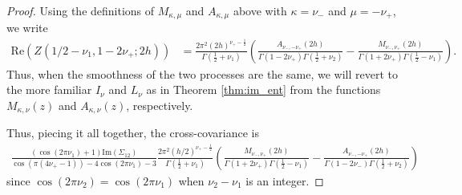 \documentclass[11pt]{article}
\begin{document}
\begin{proof}
Using the definitions of $M_{\kappa, \mu}$ and $A_{\kappa, \mu}$ above with $\kappa = \nu_-$ and $\mu = -\nu_+$, we write\begin{align*}
\textrm{Re}(Z(1/2 - \nu_{1},1 - 2\nu_+;2h)) &= \frac{2\pi^2(2h)^{\nu_+-\frac12}}{\Gamma(\frac12 + \nu_{1})}\left(\frac{ A_{\nu_-,-\nu_+}(2h)}{\Gamma(1 - 2\nu_+)\Gamma(\frac12 + \nu_{2})} - \frac{M_{\nu_-,\nu_+}(2h)}{\Gamma(1 + 2\nu_+)\Gamma(\frac12 - \nu_{1})}\right).
\end{align*}Thus, when the smoothness of the two processes are the same, we will revert to the more familiar $I_\nu$ and $L_\nu$ as in Theorem \ref{thm:im_ent} from the functions $M_{\kappa, \nu}(z)$ and $A_{\kappa, \nu}(z)$, respectively.

Thus, piecing it all together, the cross-covariance is \begin{align*}
 \frac{(\cos(2 \pi \nu_1) + 1)\textrm{Im}(\Sigma_{12})}{\cos(\pi (4\nu_+-1)) - 4\cos(2\pi \nu_1) - 3}
\frac{2\pi^2(h/2)^{\nu_+-\frac12}}{\Gamma(\frac12 + \nu_{1})}\left(\frac{M_{\nu_-,\nu_+}(2h)}{\Gamma(1 + 2\nu_+)\Gamma(\frac12 - \nu_{1})} - \frac{ A_{\nu_-,-\nu_+}(2h)}{\Gamma(1 - 2\nu_-)\Gamma(\frac12 + \nu_{2})}\right)
\end{align*}since  $\cos(2\pi\nu_2) = \cos(2\pi\nu_1)$ when $\nu_2 - \nu_1$ is an integer.

\end{proof}






\end{document}
